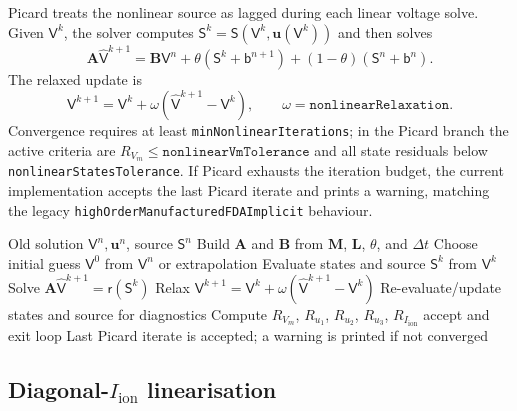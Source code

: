 \documentclass[11pt,a4paper]{article}
\newcommand{\code}[1]{\texttt{\small #1}}
\newcommand{\Vm}{V_m}
\newcommand{\Iion}{I_{\mathrm{ion}}}
\newcommand{\Mmass}{\mathbf{M}}
\newcommand{\Lop}{\mathbf{L}}
\newcommand{\Aimp}{\mathbf{A}}
\newcommand{\Bimp}{\mathbf{B}}
\begin{document}
Picard treats the nonlinear source as lagged during each linear voltage solve.
Given $\mathsf{V}^{k}$, the solver computes
$\mathsf{S}^{k}=\mathsf{S}(\mathsf{V}^{k},\mathbf{u}(\mathsf{V}^{k}))$ and then
solves
\begin{equation}
  \Aimp \widehat{\mathsf{V}}^{k+1}
  =
  \Bimp\mathsf{V}^{n}
  +\theta(\mathsf{S}^{k}+\mathsf{b}^{n+1})
  +(1-\theta)(\mathsf{S}^{n}+\mathsf{b}^{n}).
\end{equation}
The relaxed update is
\begin{equation}
  \mathsf{V}^{k+1}
  =
  \mathsf{V}^{k}
  +
  \omega\left(\widehat{\mathsf{V}}^{k+1}-\mathsf{V}^{k}\right),
  \qquad
  \omega=\texttt{nonlinearRelaxation}.
\end{equation}
Convergence requires at least \code{minNonlinearIterations}; in the Picard
branch the active criteria are $R_{\Vm}\le\texttt{nonlinearVmTolerance}$ and
all state residuals below \code{nonlinearStatesTolerance}. If Picard exhausts
the iteration budget, the current implementation accepts the last Picard
iterate and prints a warning, matching the legacy
\code{highOrderManufacturedFDAImplicit} behaviour.

\begin{algorithm}[h!]
\caption{Picard nonlinear coupling}
\label{alg:picard}
\begin{algorithmic}[1]
\Require Old solution $\mathsf{V}^n,\mathbf{u}^n$, source $\mathsf{S}^n$
\State Build $\Aimp$ and $\Bimp$ from $\Mmass$, $\Lop$, $\theta$, and $\Delta t$
\State Choose initial guess $\mathsf{V}^0$ from $\mathsf{V}^n$ or extrapolation
  \State Evaluate states and source $\mathsf{S}^k$ from $\mathsf{V}^{k}$
  \State Solve $\Aimp\widehat{\mathsf{V}}^{k+1}=\mathsf{r}(\mathsf{S}^k)$
  \State Relax $\mathsf{V}^{k+1}=\mathsf{V}^{k}+\omega(\widehat{\mathsf{V}}^{k+1}-\mathsf{V}^{k})$
  \State Re-evaluate/update states and source for diagnostics
  \State Compute $R_{\Vm}$, $R_{u_1}$, $R_{u_2}$, $R_{u_3}$, $R_{\Iion}$
    \State accept and exit loop
  \EndIf
\EndFor
\Ensure Last Picard iterate is accepted; a warning is printed if not converged
\end{algorithmic}
\end{algorithm}

\subsection{Diagonal-\texorpdfstring{$\Iion$}{Iion} linearisation}
\end{document}
